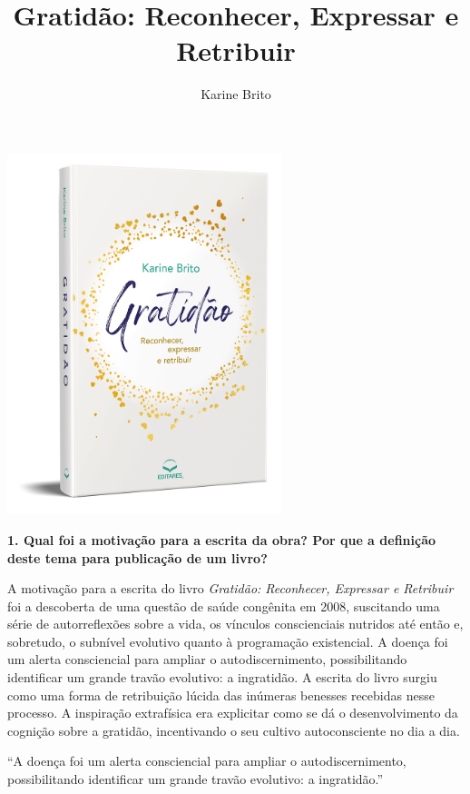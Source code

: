 \documentclass{gescons}
\author{Karine Brito}
\title{Gratidão: Reconhecer, Expressar e Retribuir}
\begin{document}
    \makeentrevistatitle

    \begin{multicols}{2}

\begin{center}
    \includegraphics[width=8cm]{articles/entrevista/mockups/Karine-Brito.png}
\end{center}

\textbf{1. Qual foi a motivação para a escrita da obra? Por que a definição deste tema para publicação de um livro?}

A motivação para a escrita do livro \textit{Gratidão: Reconhecer, Expressar e Retribuir} foi a descoberta de uma questão de saúde congênita em 2008, suscitando uma série de autorreflexões sobre a vida, os vínculos conscienciais nutridos até então e, sobretudo, o subnível evolutivo quanto à programação existencial.  A doença foi um alerta consciencial para ampliar o autodiscernimento, possibilitando identificar um grande travão evolutivo: a ingratidão. A escrita do livro surgiu como uma forma de retribuição lúcida das inúmeras benesses recebidas nesse processo. A inspiração extrafísica era explicitar como se dá o desenvolvimento da cognição sobre a gratidão, incentivando o seu cultivo autoconsciente no dia a dia. 

\begin{pullquote}
``A doença foi um alerta consciencial para ampliar o autodiscernimento, possibilitando identificar um grande travão evolutivo: a ingratidão.''
\end{pullquote}


\end{multicols}
\end{document}
